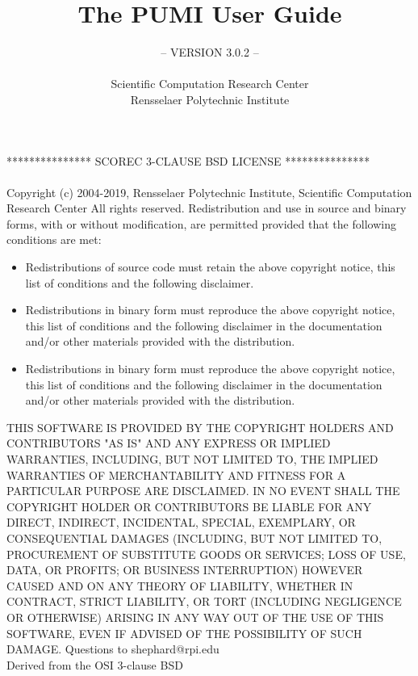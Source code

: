 \documentclass[11pt]{article}  %
\author{}
\title{}
\title{The PUMI User Guide}
\author{-- VERSION 3.0.2 --\\
\\
Scientific Computation Research Center \\
Rensselaer Polytechnic Institute}
\begin{document}
\maketitle


\newpage

\newpage
***************     SCOREC 3-CLAUSE BSD LICENSE     ***************
\\
\\
Copyright (c) 2004-2019, Rensselaer Polytechnic Institute, Scientific Computation Research Center
All rights reserved.
\newline
\newline
Redistribution and use in source and binary forms, with or without
modification, are permitted provided that the following conditions are met:

\begin{itemize}
\item Redistributions of source code must retain the above copyright notice,
  this list of conditions and the following disclaimer.

\item Redistributions in binary form must reproduce the above copyright notice,
  this list of conditions and the following disclaimer in the documentation
  and/or other materials provided with the distribution.

\item Redistributions in binary form must reproduce the above copyright notice,
  this list of conditions and the following disclaimer in the documentation
  and/or other materials provided with the distribution.
\end{itemize}

THIS SOFTWARE IS PROVIDED BY THE COPYRIGHT HOLDERS AND CONTRIBUTORS "AS IS"
AND ANY EXPRESS OR IMPLIED WARRANTIES, INCLUDING, BUT NOT LIMITED TO, THE
IMPLIED WARRANTIES OF MERCHANTABILITY AND FITNESS FOR A PARTICULAR PURPOSE ARE
DISCLAIMED. IN NO EVENT SHALL THE COPYRIGHT HOLDER OR CONTRIBUTORS BE LIABLE
FOR ANY DIRECT, INDIRECT, INCIDENTAL, SPECIAL, EXEMPLARY, OR CONSEQUENTIAL
DAMAGES (INCLUDING, BUT NOT LIMITED TO, PROCUREMENT OF SUBSTITUTE GOODS OR
SERVICES; LOSS OF USE, DATA, OR PROFITS; OR BUSINESS INTERRUPTION) HOWEVER
CAUSED AND ON ANY THEORY OF LIABILITY, WHETHER IN CONTRACT, STRICT LIABILITY,
OR TORT (INCLUDING NEGLIGENCE OR OTHERWISE) ARISING IN ANY WAY OUT OF THE USE
OF THIS SOFTWARE, EVEN IF ADVISED OF THE POSSIBILITY OF SUCH DAMAGE.
\newline
\newline
Questions to shephard@rpi.edu\\
Derived from the OSI 3-clause BSD
\newpage
\newpage

\tableofcontents
\newpage





%













%
%
%
\end{document}
